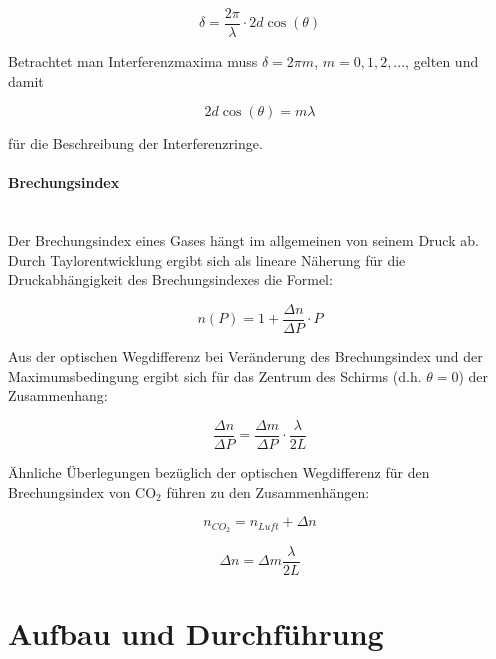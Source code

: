 \documentclass[12pt,a4paper]{article}
\begin{document}
\begin{equation}
\delta = \dfrac{2\pi}{\lambda} \cdot 2d \cos(\theta)
\end{equation}

Betrachtet man Interferenzmaxima muss $\delta = 2\pi m$, $m=0,1,2,...$, gelten und damit

\begin{equation}
2d \cos(\theta) = m\lambda
\label{equ:Maxima}
\end{equation}

für die Beschreibung der Interferenzringe.

\paragraph{Brechungsindex}\mbox{}\\
Der Brechungsindex eines Gases hängt im allgemeinen von seinem Druck ab.\\
Durch Taylorentwicklung ergibt sich als lineare Näherung für die Druckabhängigkeit des Brechungsindexes die Formel:

\begin{equation}
n(P) = 1+\frac{\Delta n}{\Delta P} \cdot P
\label{eq:DruckBrechzahl}
\end{equation}

Aus der optischen Wegdifferenz bei Veränderung des Brechungsindex und der Maximumsbedingung ergibt sich für das Zentrum des Schirms (d.h. $\theta = 0$) der Zusammenhang:

\begin{equation}
\frac{\Delta n}{\Delta P} = \frac{\Delta m}{\Delta P} \cdot  \frac{\lambda}{2L}
\label{equ:DruckBrechung}
\end{equation}

Ähnliche Überlegungen bezüglich der optischen Wegdifferenz für den Brechungsindex von $\text{CO}_2$ führen zu den Zusammenhängen:

\begin{equation}
n_{CO_2} = n_{Luft} + \Delta n
\label{eq:COO_n}
\end{equation}


\begin{equation}
\Delta n = \Delta m \frac{\lambda}{2L}
\label{eq:COO_dn}
\end{equation}



\section{Aufbau und Durchführung}
\end{document}
